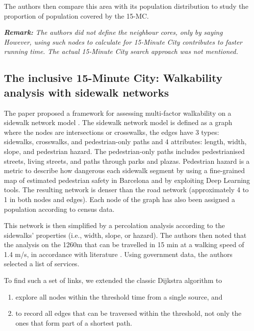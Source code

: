 The authors then compare this area with its population distribution to study the proportion of population covered by the 15-MC.

\textit{\textbf{Remark:} The authors did not define the neighbour cores, only by saying  However, using such nodes to calculate for 15-Minute City contributes to faster running time. The actual 15-Minute City search approach was not mentioned.}

\subsection{The inclusive 15-Minute City: Walkability analysis with sidewalk networks} \label{rhoads_inclusive_2023}

The paper proposed a framework for assessing multi-factor walkability on a sidewalk network model \cite{rhoads_inclusive_2023}. The sidewalk network model is defined as a graph where the nodes are intersections or crosswalks, the edges have 3 types: sidewalks, crosswalks, and pedestrian-only paths and 4 attributes: length, width, slope, and pedestrian hazard. The pedestrian-only paths includes pedestrianised streets, living streets, and paths through parks and plazas. Pedestrian hazard is a metric to describe how dangerous each sidewalk segment by using a fine-grained map of estimated pedestrian safety in Barcelona \cite{bustos_explainable_2021} and by exploiting Deep Learning tools. The resulting network is denser than the road network (approximately 4 to 1 in both nodes and edges). Each node of the graph has also been assigned a population according to census data.

This network is then simplified by a percolation analysis according to the sidewalks' properties (i.e., width, slope, or hazard). The authors then noted that the analysis on the 1260m that can be travelled in 15 min at a walking speed of 1.4 m/s, in accordance with literature \cite{bosina_estimating_2017}. Using government data, the authors selected a list of services.

To find such a set of links, we extended the classic Dijkstra algorithm to

\begin{enumerate}
\item explore all nodes within the threshold time from a single source, and
\item to record all edges that can be traversed within the threshold, not only the ones that form part of a shortest path.
\end{enumerate}

